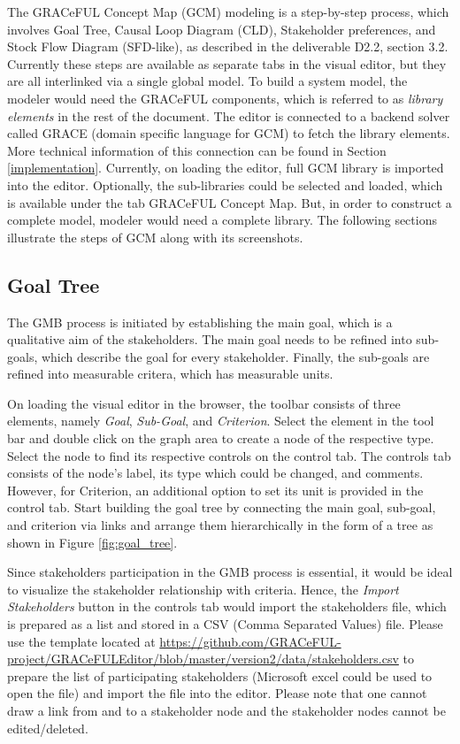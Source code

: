 \documentclass[a4paper]{article}
\begin{document}
The GRACeFUL Concept Map (GCM) modeling is a step-by-step process, which involves Goal Tree, Causal Loop Diagram (CLD), Stakeholder preferences, and Stock Flow Diagram (SFD-like), as described in the deliverable D2.2, section 3.2. Currently these steps are available as separate tabs in the visual editor, but they are all interlinked via a single global model. To build a system model, the modeler would need the GRACeFUL components, which is referred to as \textit{library elements} in the rest of the document. The editor is connected to a backend solver called GRACE (domain specific language for GCM) to fetch the library elements. More technical information of this connection can be found in Section \ref{implementation}. Currently, on loading the editor, full GCM library is imported into the editor. Optionally, the sub-libraries could be selected and loaded, which is available under the tab GRACeFUL Concept Map. But, in order to construct a complete model, modeler would need a complete library. The following sections illustrate the steps of GCM along with its screenshots.

\subsection{Goal Tree}

The GMB process is initiated by establishing the main goal, which is a qualitative aim of the stakeholders. The main goal needs to be refined into sub-goals, which describe the goal for every stakeholder. Finally, the sub-goals are refined into measurable critera, which has measurable units. 

On loading the visual editor in the browser, the toolbar consists of three elements, namely \textit{Goal}, \textit{Sub-Goal}, and \textit{Criterion}. Select the element in the tool bar and double click on the graph area to create a node of the respective type. Select the node to find its respective controls on the control tab. The controls tab consists of the node's label, its type which could be changed, and comments. However, for Criterion, an additional option to set its unit is provided in the control tab. Start building the goal tree by connecting the main goal, sub-goal, and criterion via links and arrange them hierarchically in the form of a tree as shown in Figure \ref{fig:goal_tree}. 

Since stakeholders participation in the GMB process is essential, it would be ideal to visualize the stakeholder relationship with criteria. Hence, the \textit{Import Stakeholders} button in the controls tab would import the stakeholders file, which is prepared as a list and stored in a CSV (Comma Separated Values) file. Please use the template located at \url{https://github.com/GRACeFUL-project/GRACeFULEditor/blob/master/version2/data/stakeholders.csv} to prepare the list of participating stakeholders (Microsoft excel could be used to open the file) and import the file into the editor. Please note that one cannot draw a link from and to a stakeholder node and the stakeholder nodes cannot be edited/deleted.
\end{document}
